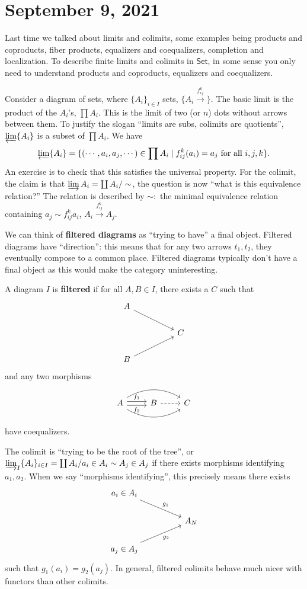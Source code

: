 \section{September 9, 2021} 
Last time we talked about limits and colimits, some examples being products and coproducts, fiber products, equalizers and coequalizers, completion and localization. To describe finite limits and colimits in $\mathsf{Set} $, in some sense you only need to understand products and coproducts, equalizers and coequalizers.

Consider a diagram of sets, where $\{A_i \} _{i \in I}$ sets, $\{A_i  \xrightarrow{f_{ij}^k} \} $. The basic limit is the product of the $A_i $'s, $\prod A_i $. This is the limit of two (or $n$) dots without arrows between them. To justify the slogan ``limits are subs, colimits are quotients'', $\varprojlim \{A_i \} $ is a subset of $\prod A_i $. We have \[
    \varprojlim \{A_i \} = \{(\cdots , a_i , a_j , \cdots ) \in \prod A_i  \mid  f_{ij}^k (a_i )=a_j \ \text{for all} \ i,j,k\} .
\] An exercise is to check that this satisfies the universal property. For the colimit, the claim is that $\varinjlim A_i =\coprod A_i  / \sim$, the question is now ``what is this equivalence relation?'' The relation is described by $\sim \colon$ the minimal equivalence relation containing $a_j  \sim f_{ij}^k a_i $, $A_i \xrightarrow{f_{ij}^k} A_j $. 

We can think of \textbf{filtered diagrams} as ``trying to have'' a final object. Filtered diagrams have ``direction'': this means that for any two arrows $t_1,t_2$, they eventually compose to a common place. Filtered diagrams typically don't have a final object as this would make the category uninteresting.
\begin{definition}[]
    A diagram $I$ is \textbf{filtered} if for all $A,B \in I$, there exists a $C$ such that
\[
\begin{tikzcd}
A \arrow[rrd] &  &   \\
              &  & C \\
B \arrow[rru] &  &  
\end{tikzcd}
\] 
    and any two morphisms  \[
   \begin{tikzcd}
       A \arrow[r, "f_1", shift left] \arrow[r, "f_2"', shift right] \arrow[rr, bend left, shift left] \arrow[rr, bend right, shift right] & B \arrow[r, dashed] & C
\end{tikzcd} 
    \] have coequalizers. 
\end{definition}
The colimit is ``trying to be the root of the tree'', or $\varinjlim_I \{A_i \} _{i \in I}=\coprod A_i / a_i  \in A_i  \sim A_j  \in A_j $ if there exists morphisms identifying $a_1,a_2$. When we say ``morphisms identifying'', this precisely means there exists \[
\begin{tikzcd}
a_i\in A_i \arrow[rrd, "g_1"]   &  &     \\
                                &  & A_N \\
a_j \in A_j \arrow[rru, "g_2"'] &  &    
\end{tikzcd}
\] such that $g_1(a_i )=g_2(a_j )$.
In general, filtered colimits behave much nicer with functors than other colimits.

